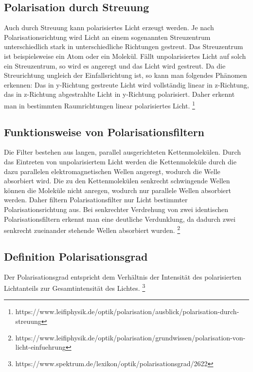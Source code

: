 \subsection*{Polarisation durch Streuung}
Auch durch Streuung kann polarisiertes Licht erzeugt werden. Je nach Polarisationsrichtung wird Licht an einem sogenannten Streuzentrum unterschiedlich stark in unterschiedliche Richtungen gestreut. Das Streuzentrum ist beispielsweise ein Atom oder ein Molekül. Fällt unpolarisiertes Licht auf solch ein Streuzentrum, so wird es angeregt und das Licht wird gestreut. Da die Streurichtung ungleich der Einfallsrichtung ist, so kann man folgendes Phänomen erkennen:  Das in y-Richtung gestreute Licht wird vollständig linear in z-Richtung, das in z-Richtung abgestrahlte Licht in y-Richtung polarisiert. Daher erkennt man in bestimmten Raumrichtungen linear polarisiertes Licht.
\footnote{https://www.leifiphysik.de/optik/polarisation/ausblick/polarisation-durch-streuung}

\subsection*{Funktionsweise von Polarisationsfiltern}
Die Filter bestehen aus langen, parallel ausgerichteten Kettenmolekülen. Durch das Eintreten von unpolarisiertem Licht werden die Kettenmoleküle durch die dazu parallelen elektromagnetischen Wellen angeregt, wodurch die Welle absorbiert wird. Die zu den Kettenmolekülen senkrecht schwingende Wellen können die Moleküle nicht anregen, wodurch nur parallele Wellen absorbiert werden. Daher filtern Polarisationsfilter nur Licht bestimmter Polarisationsrichtung aus. 
Bei senkrechter Verdrehung von zwei identischen Polarisationsfiltern erkennt man eine deutliche Verdunklung, da dadurch zwei senkrecht zueinander stehende Wellen absorbiert wurden. 
\footnote{https://www.leifiphysik.de/optik/polarisation/grundwissen/polarisation-von-licht-einfuehrung}

\subsection*{Definition Polarisationsgrad}
Der Polarisationsgrad entspricht dem Verhältnis der Intensität des polarisierten Lichtanteils zur Gesamtintensität des Lichtes.
\footnote{https://www.spektrum.de/lexikon/optik/polarisationsgrad/2622}

